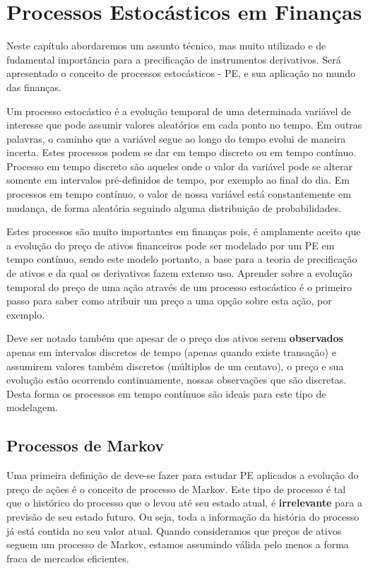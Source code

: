 \documentclass[]{book}
\begin{document}
\hypertarget{processos-estocasticos}{\chapter{Processos Estocásticos em
Finanças}\label{processos-estocasticos}}

Neste capítulo abordaremos um assunto técnico, mas muito utilizado e de
fudamental importância para a precificação de instrumentos derivativos.
Será apresentado o conceito de processos estocásticos - PE, e sua
aplicação no mundo das finanças.

Um processo estocástico é a evolução temporal de uma determinada
variável de interesse que pode assumir valores aleatórios em cada ponto
no tempo. Em outras palavras, o caminho que a variável segue ao longo do
tempo evolui de maneira incerta. Estes processos podem se dar em tempo
discreto ou em tempo contínuo. Processo em tempo discreto são aqueles
onde o valor da variável pode se alterar somente em intervalos
pré-definidos de tempo, por exemplo ao final do dia. Em processos em
tempo contínuo, o valor de nossa variável está constantemente em
mudança, de forma aleatória seguindo alguma distribuição de
probabilidades.

Estes processos são muito importantes em finanças pois, é amplamente
aceito que a evolução do preço de ativos financeiros pode ser modelado
por um PE em tempo contínuo, sendo este modelo portanto, a base para a
teoria de precificação de ativos e da qual os derivativos fazem extenso
uso. Aprender sobre a evolução temporal do preço de uma ação através de
um processo estocástico é o primeiro passo para saber como atribuir um
preço a uma opção sobre esta ação, por exemplo.

Deve ser notado também que apesar de o preço dos ativos serem
\textbf{observados} apenas em intervalos discretos de tempo (apenas
quando existe transação) e assumirem valores também discretos (múltiplos
de um centavo), o preço e sua evolução estão ocorrendo continuamente,
nossas observações que são discretas. Desta forma os processos em tempo
contínuos são ideais para este tipo de modelagem.

\section{Processos de Markov}\label{markov}

Uma primeira definição de deve-se fazer para estudar PE aplicados a
evolução do preço de ações é o conceito de processo de Markov. Este tipo
de processo é tal que o histórico do processo que o levou até seu estado
atual, é \textbf{irrelevante} para a previsão de seu estado futuro. Ou
seja, toda a informação da história do processo já está contida no seu
valor atual. Quando consideramos que preços de ativos seguem um processo
de Markov, estamos assumindo válida pelo menos a forma fraca de mercados
eficientes.
\end{document}
